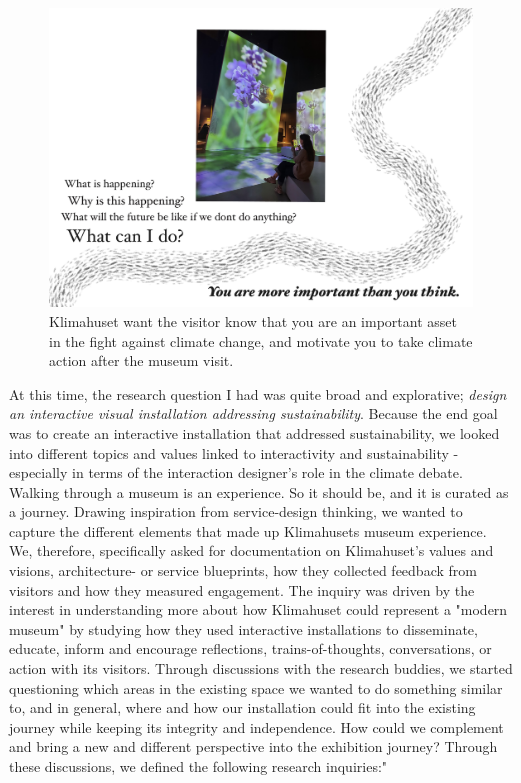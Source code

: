 \begin{figure}[H]
\includegraphics[width=12cm]{pictures/klimahuset/important.jpg}
\caption{Klimahuset want the visitor know that you are an important asset in the fight against climate change, and motivate you to take climate action after the museum visit.}
\centering 
\end{figure}

At this time, the research question I had was quite broad and explorative; \emph{design an interactive visual installation addressing sustainability}. Because the end goal was to create an interactive installation that addressed sustainability, we looked into different topics and values linked to interactivity and sustainability - especially in terms of the interaction designer's role in the climate debate. Walking through a museum is an experience. So it should be, and it is curated as a journey. Drawing inspiration from service-design thinking, we wanted to capture the different elements that made up Klimahusets museum experience. We, therefore, specifically asked for documentation on Klimahuset's values and visions, architecture- or service blueprints, how they collected feedback from visitors and how they measured engagement. The inquiry was driven by the interest in understanding more about how Klimahuset could represent a "modern museum" by studying how they used interactive installations to disseminate, educate, inform and encourage reflections, trains-of-thoughts, conversations, or action with its visitors. Through discussions with the research buddies, we started questioning which areas in the existing space we wanted to do something similar to, and in general, where and how our installation could fit into the existing journey while keeping its integrity and independence. How could we complement and bring a new and different perspective into the exhibition journey? Through these discussions, we defined the following research inquiries:"

